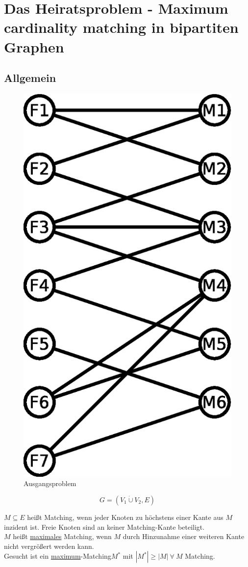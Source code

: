 \chapter[Das Heiratsproblem]{Das Heiratsproblem - Maximum cardinality matching in bipartiten Graphen}
\section{Allgemein}
\begin{figure}
\centering
\includegraphics[width=0.5\linewidth]{23/Grafik/Diagramm1}
\caption{Ausgangsproblem}
\label{fig:Diagramm1}
\end{figure}
\[ G=(V_1 \dot{\cup}V_2, E) \]

$M \subseteq E$ heißt Matching, wenn jeder Knoten zu höchstens einer Kante aus $M$ inzident ist. Freie Knoten sind an keiner Matching-Kante beteiligt.\\

$M$ heißt \underline{maximales} Matching, wenn $M$ durch Hinzunahme einer weiteren Kante nicht vergrößert werden kann.\\

Gesucht ist ein \underline{maximum}-Matching\linebreak[4] $M^*$ mit $|M^*| \geq |M|~\forall~M$ Matching.
\vspace{80pt}

